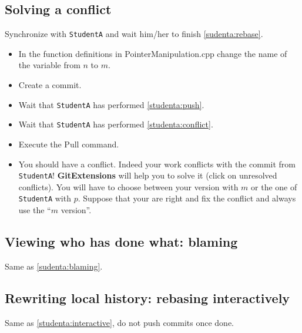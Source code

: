 \documentclass[11pt,amsfonts,amsmath]{article}
\begin{document}
\subsection{Solving a conflict}
Synchronize with \texttt{StudentA} and wait him/her to finish \ref{sudenta:rebase}.\\
\begin{itemize}
\item In the function definitions in PointerManipulation.cpp change the name of the variable from $n$ to $m$.
\item Create a commit.
\item Wait that \texttt{StudentA} has performed \ref{studenta:push}.
\item Wait that \texttt{StudentA} has performed \ref{studenta:conflict}.
\item Execute the Pull command.
\item You should have a conflict. Indeed your work conflicts with the commit from \texttt{StudentA}! \textbf{GitExtensions} will help you to solve it (click on unresolved conflicts). You will have to choose between your version with $m$ or the one of \texttt{StudentA} with $p$. Suppose that your are right and fix the conflict and always use the ``$m$ version''.
\end{itemize}

\subsection{Viewing who has done what: blaming}
Same as \ref{sudenta:blaming}.

\subsection{Rewriting local history: rebasing interactively}
Same as \ref{studenta:interactive}, do not push commits once done.
\end{document}
